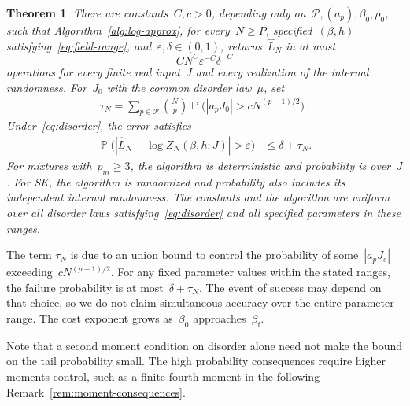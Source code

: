 \documentclass[letterpaper,11pt,reqno]{amsart}
\renewcommand{\leq}{\leqslant}
\renewcommand{\geq}{\geqslant}
\DeclareMathOperator{\pr}{\mathds{P}}
\newtheorem{theorem}{Theorem}[section]
\begin{document}
\begin{theorem}\label{thm:finite-size}
There are constants~$C,c>0$, depending only on~$\mathcal P,(a_p),\beta_0,\rho_0$, such that Algorithm~\ref{alg:log-approx}, for every~$N\geq P$, specified~$(\beta,h)$ satisfying~\eqref{eq:field-range}, and~$\varepsilon,\delta\in(0,1)$, returns~$\widehat L_N$ in at most
\begin{equation}\label{eq:finite-size-cost}
CN^C\varepsilon^{-C}\delta^{-C}
\end{equation}
operations for every finite real input~$J$ and every realization of the internal randomness. For~$J_0$ with the common disorder law~$\mu$, set
\begin{align}
\tau_N=\sum_{p\in\mathcal P}\binom Np\pr\bigl(|a_pJ_0|>cN^{(p-1)/2}\bigr)\,.\label{eq:disorder-tail}
\end{align}
Under~\eqref{eq:disorder}, the error satisfies
\begin{align}
\pr\bigl(|\widehat L_N-\log Z_N(\beta,h;J)|>\varepsilon\bigr)&\leq\delta+\tau_N.\label{eq:finite-size-error}
\end{align}
For mixtures with~$p_m\geq3$, the algorithm is deterministic and probability is over~$J$. For SK, the algorithm is randomized and probability also includes its independent internal randomness. The constants and the algorithm are uniform over all disorder laws satisfying~\eqref{eq:disorder} and all specified parameters in these ranges.
\end{theorem}

 The term $\tau_N$ is due to an union bound to control the probability of some~$|a_pJ_e|$ exceeding~$cN^{(p-1)/2}$.  For any fixed parameter values within the stated ranges, the failure probability is at most~$\delta+\tau_N$. The event of success may depend on that choice, so we do not claim simultaneous accuracy over the entire parameter range. The cost exponent grows as~$\beta_0$ approaches~$\beta_{\mathrm f}$.

Note that a second moment condition on disorder alone need not make the bound on the tail probability small. The high probability consequences require higher moments control, such as  a finite fourth moment in the following Remark~\ref{rem:moment-consequences}.
\end{document}
